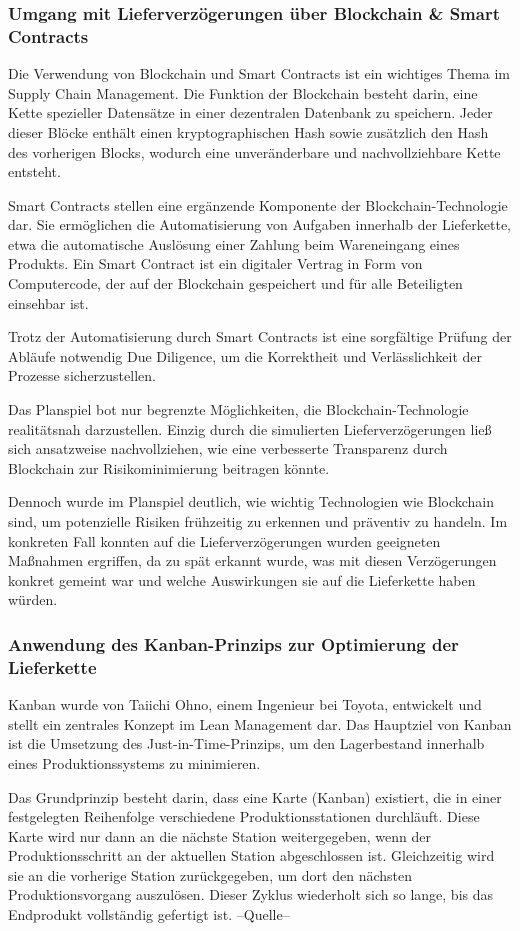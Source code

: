 \documentclass[a4paper,12pt]{article}
\begin{document}
\subsubsection{Umgang mit Lieferverzögerungen über Blockchain \& Smart Contracts}
Die Verwendung von Blockchain und Smart Contracts ist ein wichtiges Thema im Supply Chain Management.
Die Funktion der Blockchain besteht darin, eine Kette spezieller Datensätze in einer dezentralen Datenbank zu speichern.
Jeder dieser Blöcke enthält einen kryptographischen Hash sowie zusätzlich den Hash des vorherigen Blocks, wodurch eine unveränderbare und nachvollziehbare Kette entsteht.

Smart Contracts stellen eine ergänzende Komponente der Blockchain-Technologie dar.
Sie ermöglichen die Automatisierung von Aufgaben innerhalb der Lieferkette, etwa die automatische Auslösung einer Zahlung beim Wareneingang eines Produkts.
Ein Smart Contract ist ein digitaler Vertrag in Form von Computercode, der auf der Blockchain gespeichert und für alle Beteiligten einsehbar ist.

Trotz der Automatisierung durch Smart Contracts ist eine sorgfältige Prüfung der Abläufe notwendig Due Diligence,
um die Korrektheit und Verlässlichkeit der Prozesse sicherzustellen.

Das Planspiel bot nur begrenzte Möglichkeiten, die Blockchain-Technologie realitätsnah darzustellen.
Einzig durch die simulierten Lieferverzögerungen ließ sich ansatzweise nachvollziehen, wie eine verbesserte Transparenz durch Blockchain zur Risikominimierung beitragen könnte.

Dennoch wurde im Planspiel deutlich, wie wichtig Technologien wie Blockchain sind, um potenzielle Risiken frühzeitig zu erkennen und präventiv zu handeln.
Im konkreten Fall konnten auf die Lieferverzögerungen wurden geeigneten Maßnahmen ergriffen,
da zu spät erkannt wurde, was mit diesen Verzögerungen konkret gemeint war und welche Auswirkungen sie auf die Lieferkette haben würden.
\subsubsection{Anwendung des Kanban-Prinzips zur Optimierung der Lieferkette}
Kanban wurde von Taiichi Ohno, einem Ingenieur bei Toyota, entwickelt und stellt ein zentrales Konzept im Lean Management dar.
Das Hauptziel von Kanban ist die Umsetzung des Just-in-Time-Prinzips, um den Lagerbestand innerhalb eines Produktionssystems zu minimieren.

Das Grundprinzip besteht darin, dass eine Karte (Kanban) existiert, die in einer festgelegten Reihenfolge verschiedene Produktionsstationen durchläuft.
Diese Karte wird nur dann an die nächste Station weitergegeben, wenn der Produktionsschritt an der aktuellen Station abgeschlossen ist.
Gleichzeitig wird sie an die vorherige Station zurückgegeben, um dort den nächsten Produktionsvorgang auszulösen.
Dieser Zyklus wiederholt sich so lange, bis das Endprodukt vollständig gefertigt ist. --Quelle--
\end{document}
